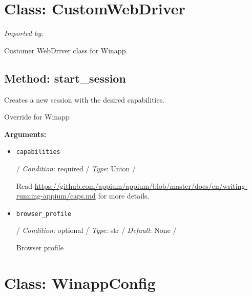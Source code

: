 %
%

\hypertarget{qconnectwinapp-winappdriver-winapp-client-customwebdriver}{%
\section{Class: CustomWebDriver}\label{qconnectwinapp-winappdriver-winapp-client-customwebdriver}}

\emph{Imported by}:

\begin{Shaded}
\begin{Highlighting}[]
\end{Highlighting}
\end{Shaded}

Customer WebDriver class for Winapp.

\hypertarget{qconnectwinapp-winappdriver-winapp-client-customwebdriver-start-session}{%
\subsection{Method: start\_session}\label{qconnectwinapp-winappdriver-winapp-client-customwebdriver-start-session}}

Creates a new session with the desired capabilities.

Override for Winapp

\textbf{Arguments:}

\begin{itemize}
\item
  \texttt{capabilities}

  / \emph{Condition}: required / \emph{Type}: Union /

  Read
  \url{https://github.com/appium/appium/blob/master/docs/en/writing-running-appium/caps.md}
  for more details.
\item
  \texttt{browser\_profile}

  / \emph{Condition}: optional / \emph{Type}: str / \emph{Default}: None
  /

  Browser profile
\end{itemize}

\hypertarget{qconnectwinapp-winappdriver-winapp-client-winappconfig}{%
\section{Class: WinappConfig}\label{qconnectwinapp-winappdriver-winapp-client-winappconfig}}

